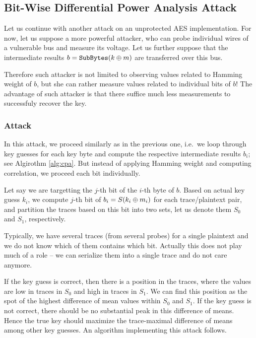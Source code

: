 
\subsection{Bit-Wise Differential Power Analysis Attack}

Let us continue with another attack on an unprotected AES implementation. For now, let us suppose a more powerful attacker, who can probe individual wires of a vulnerable bus and measure its voltage. Let us further suppose that the intermediate results $b = \texttt{SubBytes}(k\oplus m)$ are transferred over this bus.

Therefore such attacker is not limited to observing values related to Hamming weight of $b$, but she can rather measure values related to individual bits of $b$! The advantage of such attacker is that there suffice much less measurements to successfuly recover the key.

\subsubsection{Attack}
	
	In this attack, we proceed similarly as in the previous one, i.e.\ we loop through key guesses for each key byte and compute the respective intermediate results $b_i$; see Algirothm \ref{alg:cpa}. But instead of applying Hamming weight and computing correlation, we proceed each bit individually.
	
	Let say we are targetting the $j$-th bit of the $i$-th byte of $b$. Based on actual key guess $k_i$, we compute $j$-th bit of $b_i = S(k_i\oplus m_i)$ for each trace/plaintext pair, and partition the traces based on this bit into two sets, let us denote them $S_0$ and $S_1$, respectively.
	
	\begin{note}
	\label{note:concattraces}
		Typically, we have several traces (from several probes) for a single plaintext and we do not know which of them contains which bit. Actually this does not play much of a role -- we can serialize them into a single trace and do not care anymore.
	\end{note}
	
	If the key guess is correct, then there is a position in the traces, where the values are low in traces in $S_0$ and high in traces in $S_1$. We can find this position as the spot of the highest difference of mean values within $S_0$ and $S_1$. If the key guess is not correct, there should be no substantial peak in this difference of means. Hence the true key should maximize the trace-maximal difference of means among other key guesses. An algorithm implementing this attack follows.
	
